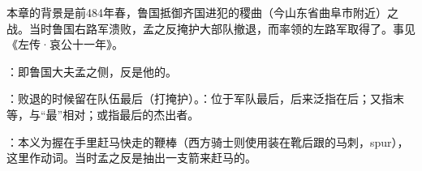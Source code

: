 {本章的背景是前484年春，鲁国抵御齐国进犯的稷曲（今山东省曲阜市附近）之战。当时鲁国右路军溃败，孟之反掩护大部队撤退，而率领的左路军取得了。事见《左传·哀公十一年》。
\begin{lyblobitemize}
\item {}：即鲁国大夫孟之侧，反是他的。
\item {}：败退的时候留在队伍最后（打掩护）。：位于军队最后，后来泛指在后；又指末等，与“最”相对；或指最后的杰出者。

\item {}：本义为握在手里赶马快走的鞭棒（西方骑士则使用装在靴后跟的马刺，spur），这里作动词。当时孟之反是抽出一支箭来赶马的。
\end{lyblobitemize}
}
{}


